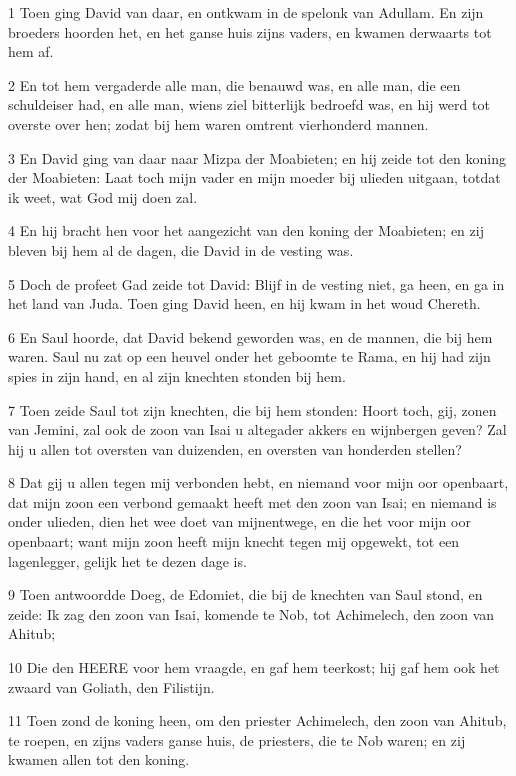\par 1 Toen ging David van daar, en ontkwam in de spelonk van Adullam. En zijn broeders hoorden het, en het ganse huis zijns vaders, en kwamen derwaarts tot hem af.
\par 2 En tot hem vergaderde alle man, die benauwd was, en alle man, die een schuldeiser had, en alle man, wiens ziel bitterlijk bedroefd was, en hij werd tot overste over hen; zodat bij hem waren omtrent vierhonderd mannen.
\par 3 En David ging van daar naar Mizpa der Moabieten; en hij zeide tot den koning der Moabieten: Laat toch mijn vader en mijn moeder bij ulieden uitgaan, totdat ik weet, wat God mij doen zal.
\par 4 En hij bracht hen voor het aangezicht van den koning der Moabieten; en zij bleven bij hem al de dagen, die David in de vesting was.
\par 5 Doch de profeet Gad zeide tot David: Blijf in de vesting niet, ga heen, en ga in het land van Juda. Toen ging David heen, en hij kwam in het woud Chereth.
\par 6 En Saul hoorde, dat David bekend geworden was, en de mannen, die bij hem waren. Saul nu zat op een heuvel onder het geboomte te Rama, en hij had zijn spies in zijn hand, en al zijn knechten stonden bij hem.
\par 7 Toen zeide Saul tot zijn knechten, die bij hem stonden: Hoort toch, gij, zonen van Jemini, zal ook de zoon van Isai u altegader akkers en wijnbergen geven? Zal hij u allen tot oversten van duizenden, en oversten van honderden stellen?
\par 8 Dat gij u allen tegen mij verbonden hebt, en niemand voor mijn oor openbaart, dat mijn zoon een verbond gemaakt heeft met den zoon van Isai; en niemand is onder ulieden, dien het wee doet van mijnentwege, en die het voor mijn oor openbaart; want mijn zoon heeft mijn knecht tegen mij opgewekt, tot een lagenlegger, gelijk het te dezen dage is.
\par 9 Toen antwoordde Doeg, de Edomiet, die bij de knechten van Saul stond, en zeide: Ik zag den zoon van Isai, komende te Nob, tot Achimelech, den zoon van Ahitub;
\par 10 Die den HEERE voor hem vraagde, en gaf hem teerkost; hij gaf hem ook het zwaard van Goliath, den Filistijn.
\par 11 Toen zond de koning heen, om den priester Achimelech, den zoon van Ahitub, te roepen, en zijns vaders ganse huis, de priesters, die te Nob waren; en zij kwamen allen tot den koning.
